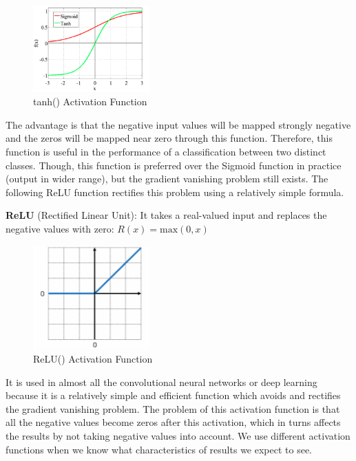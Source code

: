 \documentclass[a4paper,11pt,oneside]{book}
\begin{document}
\begin{figure}[!h]
	\centering
	\includegraphics[width=0.4\textwidth]{figures/tanh}
	\caption{tanh() Activation Function}
	\label{fourthfig}
\end{figure}

The advantage is that the negative input values will be mapped
strongly negative and the zeros will be mapped near zero through this
function. Therefore, this function is useful in the performance of a classification between two distinct classes.
Though, this function is preferred over the Sigmoid function in practice (output in wider range), but the gradient vanishing
problem still exists. The following ReLU function rectifies this problem
using a relatively simple formula.\newline\newline

\textbf{ReLU} (Rectified Linear Unit): It takes a real-valued input and replaces the negative values with zero:
\newline\newline
$R(x)= \text{max}(0,x)$
\begin{figure}[!h]
	\centering
	\includegraphics[width=0.4\textwidth]{figures/Relu}
	\caption{ReLU() Activation Function}
	\label{fifthfig}
\end{figure}
\newline\newline It is used in almost all the convolutional neural networks or deep learning because it is a relatively simple and efficient
function which avoids and rectifies the gradient vanishing problem.
The problem of this activation function is that all the negative
values become zeros after this activation, which in turns affects the
results by not taking negative values into account.
\newline\newline We use different activation functions when we know what characteristics of results we expect to see.
\end{document}
